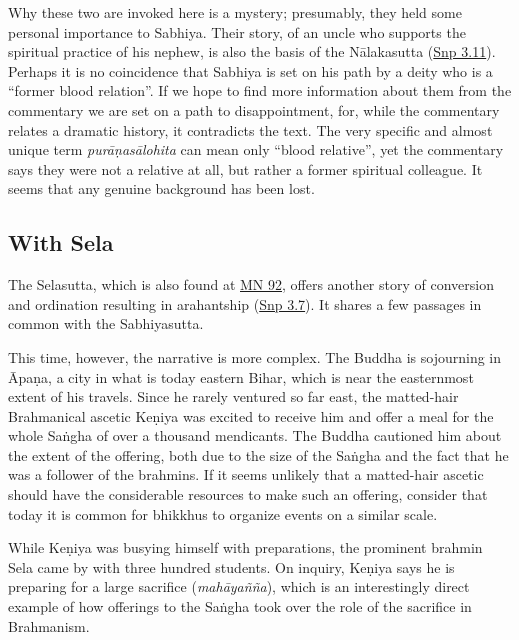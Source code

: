 \documentclass[12pt,openany]{book}%
\begin{document}
Why these two are invoked here is a mystery; presumably, they held some personal importance to Sabhiya. Their story, of an uncle who supports the spiritual practice of his nephew, is also the basis of the \textsanskrit{Nālakasutta} (\href{https://suttacentral.net/snp3.11}{Snp 3.11}). Perhaps it is no coincidence that Sabhiya is set on his path by a deity who is a “former blood relation”. If we hope to find more information about them from the commentary we are set on a path to disappointment, for, while the commentary relates a dramatic history, it contradicts the text. The very specific and almost unique term \textit{\textsanskrit{purāṇasālohita}} can mean only “blood relative”, yet the commentary says they were not a relative at all, but rather a former spiritual colleague. It seems that any genuine background has been lost. 

\subsection*{With Sela}

The Selasutta, which is also found at \href{https://suttacentral.net/mn92/en/sujato}{MN 92}, offers another story of conversion and ordination resulting in arahantship (\href{https://suttacentral.net/snp3.7/en/sujato}{Snp 3.7}). It shares a few passages in common with the Sabhiyasutta.

This time, however, the narrative is more complex. The Buddha is sojourning in \textsanskrit{Āpaṇa}, a city in what is today eastern Bihar, which is near the easternmost extent of his travels. Since he rarely ventured so far east, the matted-hair Brahmanical ascetic \textsanskrit{Keṇiya} was excited to receive him and offer a meal for the whole \textsanskrit{Saṅgha} of over a thousand mendicants. The Buddha cautioned him about the extent of the offering, both due to the size of the \textsanskrit{Saṅgha} and the fact that he was a follower of the brahmins. If it seems unlikely that a matted-hair ascetic should have the considerable resources to make such an offering, consider that today it is common for bhikkhus to organize events on a similar scale.

While \textsanskrit{Keṇiya} was busying himself with preparations, the prominent brahmin Sela came by with three hundred students. On inquiry, \textsanskrit{Keṇiya} says he is preparing for a large sacrifice (\textit{\textsanskrit{mahāyañña}}), which is an interestingly direct example of how offerings to the \textsanskrit{Saṅgha} took over the role of the sacrifice in Brahmanism.
\end{document}
